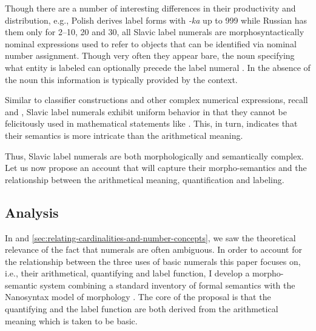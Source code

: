 \documentclass[output=paper]{langscibook}
\begin{document}
Though there are a number of interesting differences in their productivity and distribution, e.g., Polish derives label forms with \textit{-ka} up to 999 while Russian has them only for 2--10, 20 and 30, all Slavic label numerals are morphosyntactically nominal expressions used to refer to objects that can be identified via nominal number assignment. Though very often they appear bare, the noun specifying what entity is labeled can optionally precede the label numeral . In the absence of the noun this information is typically provided by the context.

\label{ex:label-czech}
\z

\noindent Similar to classifier constructions and other complex numerical expressions, recall  and , Slavic label numerals exhibit uniform behavior in that they cannot be felicitously used in mathematical statements like . This, in turn, indicates that their semantics is more intricate than the arithmetical meaning. 

	\ea\label{ex:arithmetical} 
	\label{ex:arithmetical-czech}
    \z
    \z

\noindent Thus, Slavic label numerals are both morphologically and semantically complex. Let us now propose an account that will capture their morpho-semantics and the relationship between the arithmetical meaning, quantification and labeling.

	\subsection{Analysis}\label{sec:analysis}

In  and \ref{sec:relating-cardinalities-and-number-concepts}, we saw the theoretical relevance of the fact that numerals are often ambiguous. In order to account for the relationship between the three uses of basic numerals this paper focuses on, i.e., their arithmetical, quantifying and label function, I develop a morpho-semantic system combining a standard inventory of formal semantics with the Nanosyntax model of morphology \citep[see][]{wagiel_caha2020universal}. The core of the proposal is that the quantifying and the label function are both derived from the arithmetical meaning which is taken to be basic. 
\end{document}
